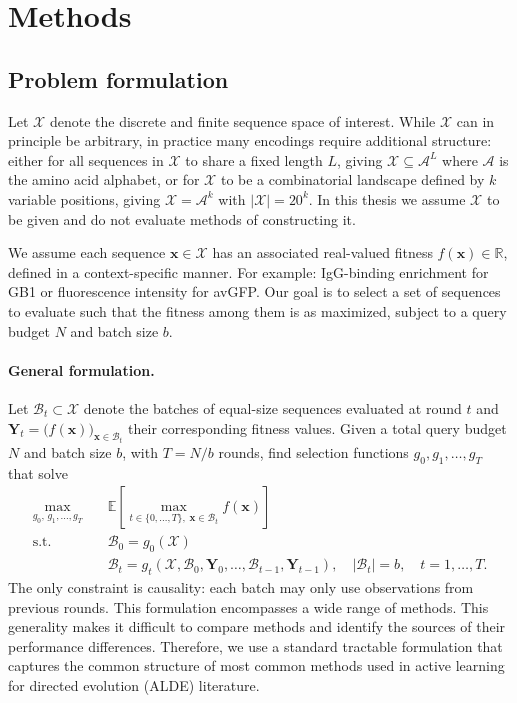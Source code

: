 \section{Methods}  \label{sec:methods}

\subsection{Problem formulation}

Let $\mathcal{X}$ denote the discrete and finite sequence space of interest.  While $\mathcal{X}$ can in principle be arbitrary, in practice many encodings require additional structure: either for all sequences in $\mathcal{X}$ to share a fixed length $L$, giving $\mathcal{X} \subseteq \mathcal{A}^L$ where $\mathcal{A}$ is the amino acid alphabet, or for $\mathcal{X}$ to be a combinatorial landscape defined by $k$ variable positions, giving $\mathcal{X} = \mathcal{A}^k$ with $|\mathcal{X}| = 20^k$. In this thesis we assume $\mathcal{X}$ to be given and do not evaluate methods of constructing it.

We assume each sequence $\mathbf{x} \in \mathcal{X}$ has an associated real-valued fitness $f(\mathbf{x}) \in \mathbb{R}$, defined in a context-specific manner. For example: IgG-binding enrichment for GB1 or fluorescence intensity for avGFP. Our goal is to select a set of sequences to evaluate such that the fitness among them is as maximized, subject to a query budget $N$ and batch size $b$. 

\paragraph{General formulation.}
Let $\mathcal{B}_t \subset \mathcal{X}$ denote the batches of equal-size sequences evaluated at round $t$ and $\mathbf{Y}_t = \bigl(f(\mathbf{x})\bigr)_{\mathbf{x} \in \mathcal{B}_t}$ their corresponding fitness values. Given a total query budget $N$ and batch size $b$, with $T = N/b$ rounds, find selection functions $g_0, g_1, \ldots, g_{T}$ that solve
\begin{equation}
\begin{aligned}
  \max_{g_0,\,g_1,\ldots,g_{T}} \quad & \mathbb{E}\!\left[\max_{t \in \{0,\ldots,T\},\;\mathbf{x}\in\mathcal{B}_t} f(\mathbf{x})\right] \\
  \text{s.t.} \quad
    & \mathcal{B}_0 = g_0(\mathcal{X})\\
    & \mathcal{B}_t = g_t(\mathcal{X}, \mathcal{B}_0, \mathbf{Y}_0, \ldots, \mathcal{B}_{t-1}, \mathbf{Y}_{t-1}), \quad |\mathcal{B}_t| = b, \quad t = 1,\ldots,T.
\end{aligned}
\label{equation:generalformulation}
\end{equation}
The only constraint is causality: each batch may only use observations from previous rounds. This formulation encompasses a wide range of methods. This generality makes it difficult to compare methods and identify the sources of their performance differences. Therefore, we use a standard tractable formulation that captures the common structure of most common methods used in active learning for directed evolution (ALDE) literature. 

